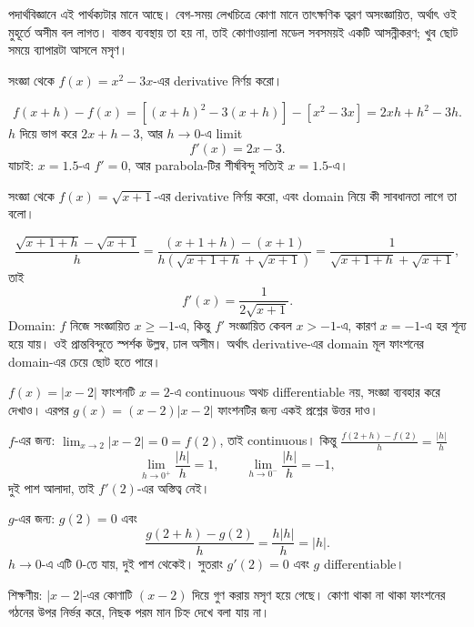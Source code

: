 \documentclass[11pt]{article}
\begin{document}
\begin{remark}
পদার্থবিজ্ঞানে এই পার্থক্যটার মানে আছে। বেগ-সময় লেখচিত্রে কোণা মানে
তাৎক্ষণিক ত্বরণ অসংজ্ঞায়িত, অর্থাৎ ওই মুহূর্তে অসীম বল লাগত। বাস্তব ব্যবস্থায়
তা হয় না, তাই কোণাওয়ালা মডেল সবসময়ই একটি আসন্নীকরণ; খুব ছোট সময়ে ব্যাপারটা
আসলে মসৃণ।
\end{remark}

 সংজ্ঞা থেকে $f(x) = x^{2} - 3x$-এর derivative নির্ণয় করো।

\begin{sol}
\[
  f(x+h) - f(x) = \left[ (x+h)^{2} - 3(x+h) \right] - \left[ x^{2}-3x \right]
  = 2xh + h^{2} - 3h .
\]
$h$ দিয়ে ভাগ করে $2x + h - 3$, আর $h \to 0$-এ limit
\[
  f'(x) = 2x - 3 .
\]
যাচাই: $x = 1.5$-এ $f' = 0$, আর parabola-টির শীর্ষবিন্দু সত্যিই $x = 1.5$-এ।
\end{sol}

 সংজ্ঞা থেকে $f(x) = \sqrt{x+1}$-এর derivative নির্ণয় করো, এবং domain
নিয়ে কী সাবধানতা লাগে তা বলো।

\begin{sol}
\[
  \frac{\sqrt{x+1+h} - \sqrt{x+1}}{h}
  = \frac{(x+1+h) - (x+1)}{h\left( \sqrt{x+1+h} + \sqrt{x+1} \right)}
  = \frac{1}{\sqrt{x+1+h} + \sqrt{x+1}} ,
\]
তাই
\[
  f'(x) = \frac{1}{2\sqrt{x+1}} .
\]
Domain: $f$ নিজে সংজ্ঞায়িত $x \geq -1$-এ, কিন্তু $f'$ সংজ্ঞায়িত কেবল
$x > -1$-এ, কারণ $x = -1$-এ হর শূন্য হয়ে যায়। ওই প্রান্তবিন্দুতে স্পর্শক
উল্লম্ব, ঢাল অসীম। অর্থাৎ derivative-এর domain মূল ফাংশনের domain-এর চেয়ে
ছোট হতে পারে।
\end{sol}

 $f(x) = |x-2|$ ফাংশনটি $x = 2$-এ continuous অথচ differentiable নয়,
সংজ্ঞা ব্যবহার করে দেখাও। এরপর $g(x) = (x-2)|x-2|$ ফাংশনটির জন্য একই প্রশ্নের
উত্তর দাও।

\begin{sol}
$f$-এর জন্য: $\lim_{x \to 2} |x-2| = 0 = f(2)$, তাই continuous। কিন্তু $\frac{f(2+h)-f(2)}{h} = \frac{|h|}{h}$
\[
  \lim_{h \to 0^{+}} \frac{|h|}{h} = 1, \qquad
  \lim_{h \to 0^{-}} \frac{|h|}{h} = -1 ,
\]
দুই পাশ আলাদা, তাই $f'(2)$-এর অস্তিত্ব নেই।

$g$-এর জন্য: $g(2) = 0$ এবং
\[
  \frac{g(2+h) - g(2)}{h} = \frac{h|h|}{h} = |h| .
\]
$h \to 0$-এ এটি $0$-তে যায়, দুই পাশ থেকেই। সুতরাং $g'(2) = 0$ এবং $g$
differentiable।

শিক্ষণীয়: $|x-2|$-এর কোণাটি $(x-2)$ দিয়ে গুণ করায় মসৃণ হয়ে গেছে। কোণা থাকা
না থাকা ফাংশনের গঠনের উপর নির্ভর করে, নিছক পরম মান চিহ্ন দেখে বলা যায় না।
\end{sol}
\end{document}

